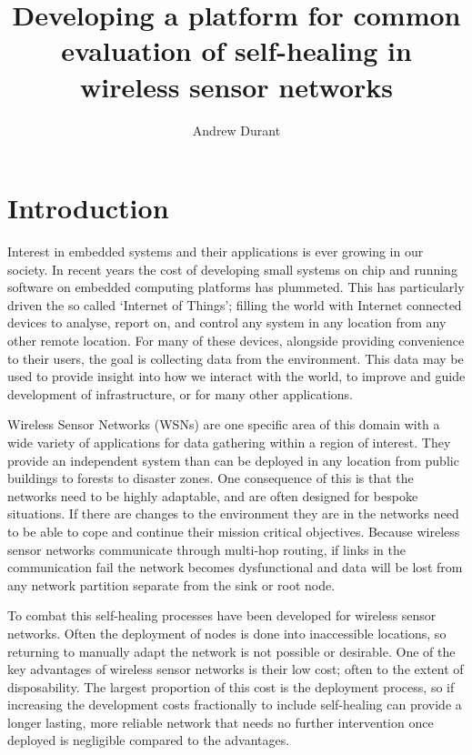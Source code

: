 \documentclass[authoryearcitations]{UoYCSproject}
\author{Andrew Durant}
\title{Developing a platform for common evaluation of self-healing in wireless sensor networks}
\begin{document}
\maketitle
\listoffigures
\listoftables
\renewcommand{\lstlistlistingname}{List of Listings}
\lstlistoflistings

\chapter{Introduction}
\label{cha:Introduction}

Interest in embedded systems and their applications is ever growing in our society. In recent years the cost of developing small systems on chip and running software on embedded computing platforms has plummeted. This has particularly driven the so called `Internet of Things'; filling the world with Internet connected devices to analyse, report on, and control any system in any location from any other remote location. For many of these devices, alongside providing convenience to their users, the goal is collecting data from the environment. This data may be used to provide insight into how we interact with the world, to improve and guide development of infrastructure, or for many other applications.

Wireless Sensor Networks (WSNs) are one specific area of this domain with a wide variety of applications for data gathering within a region of interest. They provide an independent system than can be deployed in any location from public buildings to forests to disaster zones. One consequence of this is that the networks need to be highly adaptable, and are often designed for bespoke situations. If there are changes to the environment they are in the networks need to be able to cope and continue their mission critical objectives. Because wireless sensor networks communicate through multi-hop routing, if links in the communication fail the network becomes dysfunctional and data will be lost from any network partition separate from the sink or root node.

To combat this self-healing processes have been developed for wireless sensor networks. Often the deployment of nodes is done into inaccessible locations, so returning to manually adapt the network is not possible or desirable. One of the key advantages of wireless sensor networks is their low cost; often to the extent of disposability. The largest proportion of this cost is the deployment process, so if increasing the development costs fractionally to include self-healing can provide a longer lasting, more reliable network that needs no further intervention once deployed is negligible compared to the advantages.
\end{document}
